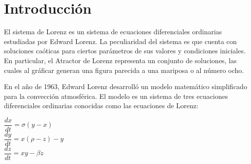 \begin{titlepage}


{\large \date[24 de mayo, 2018 \\Hermosillo, Sonora}\\[1cm] %


\texttt{[image: Logo]}\\[0.5cm] %
 

\vfill %

\end{titlepage}

\section{Introducción}
El sistema de Lorenz es un sistema de ecuaciones diferenciales ordinarias estudiadas por Edward Lorenz. La peculiaridad del sistema es que cuenta con soluciones caóticas para ciertos parámetros de sus valores y condiciones iniciales. En particular, el Atractor de Lorenz representa un conjunto de soluciones, las cuales al gráficar generan una figura parecida a una mariposa o al número ocho.

En el año de 1963, Edward Lorenz desarrolló un modelo matemático simplificado para la convección atmosférica. El modelo es un sistema de tres ecuaciones diferenciales ordinarias conocidas como las ecuaciones de Lorenz:

\begin{center}
	$ \dfrac{dx}{dt} = \sigma (y - x) $ \\
    $ \dfrac{dy}{dt} = x (\rho - z) - y $ \\
    $ \dfrac{dz}{dt} = xy - \beta z $
\end{center}

